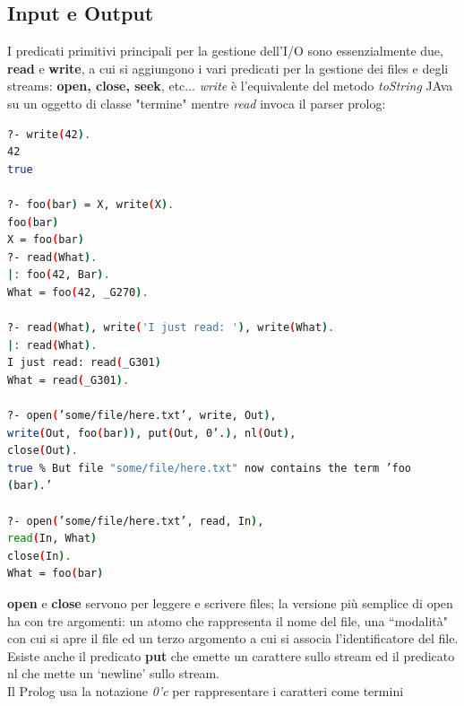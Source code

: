 \documentclass[a4paper,12pt, oneside]{book}
\begin{document}
\subsection{Input e Output}
I predicati primitivi principali per la gestione dell'I/O sono
essenzialmente due, \textbf{read} e \textbf{write}, a cui si aggiungono i vari predicati per la gestione dei files e degli streams: \textbf{open, close, seek}, etc...
\textit{write} è l'equivalente del metodo \textit{toString} JAva su un oggetto di classe "termine" mentre \textit{read} invoca il parser prolog:
\begin{shaded}
\begin{lstlisting}[language=bash]
?- write(42).
42
true

?- foo(bar) = X, write(X).
foo(bar)
X = foo(bar)
?- read(What).
|: foo(42, Bar).
What = foo(42, _G270).

?- read(What), write('I just read: '), write(What).
|: read(What).
I just read: read(_G301)
What = read(_G301).

?- open(’some/file/here.txt’, write, Out),
write(Out, foo(bar)), put(Out, 0’.), nl(Out),
close(Out).
true % But file "some/file/here.txt" now contains the term ’foo
(bar).’

?- open(’some/file/here.txt’, read, In),
read(In, What)
close(In).
What = foo(bar)
\end{lstlisting}
\end{shaded}
\textbf{open} e \textbf{close} servono per leggere e scrivere files; la versione più semplice di open ha con tre argomenti: un atomo che rappresenta il nome del file, una “modalità" con cui si apre il file ed un terzo argomento a cui si associa l’identificatore del file.\\
Esiste anche il predicato \textbf{put} che emette un carattere sullo stream ed il predicato nl che mette un ‘newline’ sullo stream.\\
Il Prolog usa la notazione \textit{0'c} per rappresentare i caratteri come termini
\end{document}
